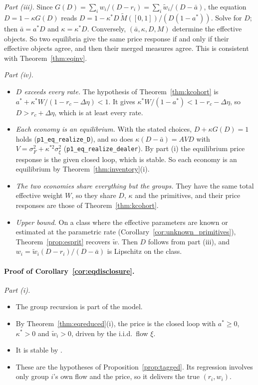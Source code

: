 \documentclass[12pt]{article}
\theoremstyle{definition}
\theoremstyle{remark}
\begin{document}
\emph{Part (iii).} Since $G(D)=\sum_iw_i/(D-r_i)=\sum_i\tilde w_i/(D-\bar a)$, the equation $D=1-\kappa G(D)$ reads $D=1-\kappa^*D\,\tilde M([0,1])/(D(1-a^*))$. Solve for $D$; then $\bar a=a^*D$ and $\kappa=\kappa^*D$. Conversely, $(\bar a,\kappa,D,M)$ determine the effective objects. So two equilibria give the same price response if and only if their effective objects agree, and then their merged measures agree. This is consistent with Theorem~\ref{thm:eqinv}.

\emph{Part (iv).}
\begin{itemize}[itemsep=1pt,topsep=2pt]
\item \emph{$D$ exceeds every rate.} The hypothesis of Theorem~\ref{thm:kcohort} is $a^*+\kappa^*W/(1-r_c-\Delta\eta)<1$. It gives $\kappa^*W/(1-a^*)<1-r_c-\Delta\eta$, so $D>r_c+\Delta\eta$, which is at least every rate.
\item \emph{Each economy is an equilibrium.} With the stated choices, $D+\kappa G(D)=1$ holds (\nolinkurl{p1_eq_realize_D}), and so does $\kappa(D-\bar a)=AVD$ with $V=\sigma_F^2+\kappa^{*2}\sigma_\xi^2$ (\nolinkurl{p1_eq_realize_dealer}). By part (i) the equilibrium price response is the given closed loop, which is stable. So each economy is an equilibrium by Theorem~\ref{thm:inventory}(i).
\item \emph{The two economies share everything but the groups.} They have the same total effective weight $W$, so they share $D$, $\kappa$ and the primitives, and their price responses are those of Theorem~\ref{thm:kcohort}.
\item \emph{Upper bound.} On a class where the effective parameters are known or estimated at the parametric rate (Corollary~\ref{cor:unknown_primitives}), Theorem~\ref{prop:esprit} recovers $\tilde w$. Then $D$ follows from part (iii), and $w_i=\tilde w_i(D-r_i)/(D-\bar a)$ is Lipschitz on the class.
\end{itemize}

\paragraph{Proof of Corollary~\ref{cor:eqdisclosure}.}
\emph{Part (i).}
\begin{itemize}[itemsep=1pt,topsep=2pt]
\item The group recursion is part of the model.
\item By Theorem~\ref{thm:eqreduced}(i), the price is the closed loop with $a^*\ge0$, $\kappa^*>0$ and $\tilde w_i>0$, driven by the i.i.d.\ flow $\xi$.
\item It is stable by \citet[Theorem~S9.2(iv)]{niroula2026full}.
\item These are the hypotheses of Proposition~\ref{prop:tagged}. Its regression involves only group $i$'s own flow and the price, so it delivers the true $(r_i,w_i)$.
\end{itemize}
\end{document}
